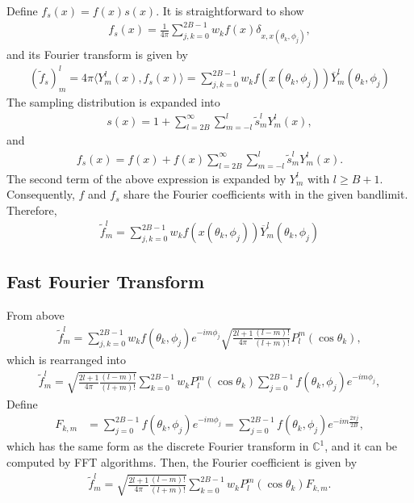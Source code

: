 \documentclass[onecolumn,11pt]{IEEEtran}
\newcommand{\pair}[1]{\ensuremath{\langle #1 \rangle}}
\begin{document}
Define $f_s(x)= f(x) s(x)$. It is straightforward to show
\begin{align*}
    f_s(x) = \frac{1}{4\pi}\sum_{j,k=0}^{2B-1} w_k f(x) \delta_{x, x(\theta_k,\phi_j)},
\end{align*}
and its Fourier transform is given by
\begin{align}
    (\tilde f_s)^l_m = 4\pi \pair{ Y^l_m(x), f_s(x) } =  \sum_{j,k=0}^{2B-1} w_k f(x(\theta_k,\phi_j)) \overline{Y}^l_m(\theta_k,\phi_j)
\end{align}
The sampling distribution is expanded into
\begin{align*}
    s(x) = 1 + \sum_{l=2B}^\infty \sum_{m=-l}^l \tilde s^l_m Y^l_m(x),
\end{align*}
and
\begin{align*}
    f_s(x) = f(x) + f(x)\sum_{l=2B}^\infty \sum_{m=-l}^l \tilde s^l_m Y^l_m(x).
\end{align*}
The second term of the above expression is expanded by $Y^l_m$ with $l\geq B+1$. 
Consequently, $f$ and $f_s$ share the Fourier coefficients with in the given bandlimit.
Therefore,
\begin{align}
    \tilde f^l_m = \sum_{j,k=0}^{2B-1} w_k f(x(\theta_k,\phi_j)) \overline{Y}^l_m(\theta_k,\phi_j)
\end{align}

\subsection{Fast Fourier Transform}
From above
\begin{align}
    \tilde f^l_m = \sum_{j,k=0}^{2B-1} w_k f(\theta_k,\phi_j) e^{-im\phi_j} \sqrt{\frac{2l+1}{4\pi}\frac{(l-m)!}{(l+m)!}}  P^m_l(\cos\theta_k),
\end{align}
which is rearranged into
\begin{align}
    \tilde f^l_m = \sqrt{\frac{2l+1}{4\pi}\frac{(l-m)!}{(l+m)!}} \sum_{k=0}^{2B-1} w_k    P^m_l(\cos\theta_k) \sum_{j=0}^{2B-1} f(\theta_k,\phi_j) e^{-im\phi_j},
\end{align}
Define
\begin{align*}
    F_{k,m} & = \sum_{j=0}^{2B-1} f(\theta_k,\phi_j) e^{-im\phi_j} = \sum_{j=0}^{2B-1} f(\theta_k,\phi_j) e^{-im \frac{2\pi j}{2B}},
\end{align*}
which has the same form as the discrete Fourier transform in $\mathbb{C}^1$, and it can be computed by FFT algorithms. 
Then, the Fourier coefficient is given by
\begin{align}
    \tilde f^l_m = \sqrt{\frac{2l+1}{4\pi}\frac{(l-m)!}{(l+m)!}} \sum_{k=0}^{2B-1} w_k    P^m_l(\cos\theta_k) F_{k,m}.
\end{align}
\end{document}
